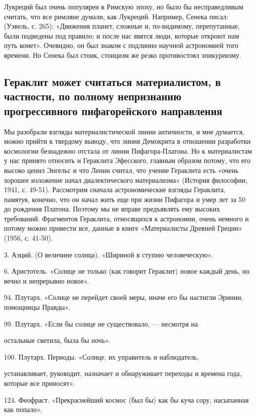Лукреций был очень популярен в Римскую эпоху, но было бы
несправедливым считать, что все римляне думали, как Лукреций.
Например, Сенека писал: (Уэвель, с. 265): «Движения планет, сложные и,
по-видимому, перепутанные, были подведены под правило; и после нас
явятся люди, которые откроют нам путь комет». Очевидно, он был знаком
с подлинно научной астрономией того времени. Но Сенека был стоик,
стоицизм же резко противостоял эпикуреизму.

\subsection{Гераклит может считаться материалистом, в частности, по
полному непризнанию прогрессивного пифагорейского направления}

Мы разобрали взгляды материалистической линии античности, и мне
думается, можно прийти к твердому выводу, что линия Демокрита в
отношении разработки космологии безнадежно отстала от линии
Пифагора-Платона. Но к материалистам у нас принято относить и
Гераклита Эфесского, главным образом потому, что его высоко ценил
Энгельс и что Ленин считал, что учение Гераклита есть «очень хорошее
изложение начал диалектического материализма» (История философии,
1941, с. 49-51). Рассмотрим сначала астрономические взгляды Гераклита,
памятуя, конечно, что он начал жить еще при жизни Пифагора и умер лет
за 50 до рождения Платона. Поэтому мы не вправе предъявлять ему
высоких требований. Фрагментов Гераклита, относящихся к астрономии,
очень немного и потому можно привести все, данные в книге
«Материалисты Древней Греции» (1956, с. 41-50).

3. Аэций. (О величине солнца). «Шириной в ступню человеческую».

6. Аристотель. «Солнце не только (как говорит Гераклит) новое каждый
день, но вечно и непрерывно новое».

94. Плутарх. «Солнце не перейдет своей меры, иначе его бы настигли
Эринии, помощницы Правды».

99. Плутарх. «Если бы солнце не существовало, --- несмотря на

остальные светила, была бы ночь».

100. Плутарх. Периоды. «Солнце, их управитель и наблюдатель,

устанавливает, руководит, назначает и обнаруживает переходы и времена
года, которые все приносят».

124. Феофраст. «Прекраснейший космос (был бы) как бы куча сору,
насыпанная как попало».

